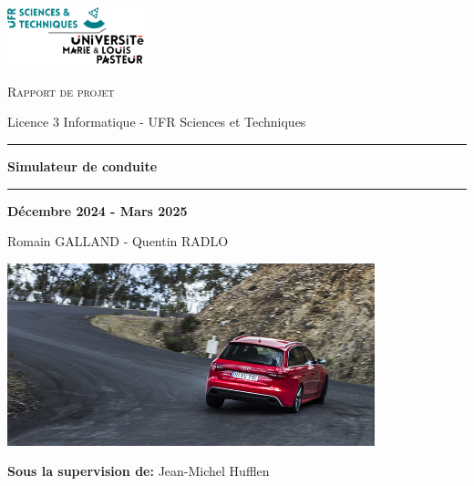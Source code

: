 \documentclass[a4paper,12pt]{report}
\begin{document}
    \begin{titlepage}

        \begin{center}
            \vspace{2cm}
            \includegraphics[width=0.3\textwidth]{resources/university_logo}\par
        \end{center}



        \begin{center}
            \vspace{0.2cm}
            {\scshape \large{Rapport de projet} \par}
            Licence 3 Informatique - UFR Sciences et Techniques
            \vspace{0.4cm}
            \hrule
            \vspace{0.4cm}
            {\huge\bfseries Simulateur de conduite \par}
            \vspace{0.4cm}
            \hrule
            \vspace{1cm}
            {\large\bfseries Décembre 2024 - Mars 2025 \par}
            Romain GALLAND - Quentin RADLO
            \vspace{1cm}
            \begin{center}
                \includegraphics[width=0.8\textwidth]{resources/illustration}
            \end{center}


            \vspace{1cm}
            {\bfseries Sous la supervision de:} Jean-Michel Hufflen \\


        \end{center}
    \end{titlepage}
\end{document}
